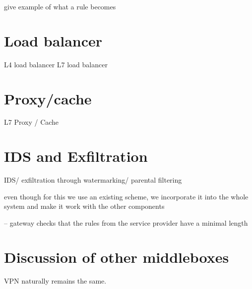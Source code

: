 give example of what a rule becomes

\section{Load balancer}\label{sec:loadb}

L4 load balancer
L7 load balancer

\section{Proxy/cache}\label{sec:proxy}

L7 Proxy / Cache

\section{IDS and Exfiltration}\label{sec:IDS}

IDS/ exfiltration through watermarking/ parental filtering

even though for this we use an existing scheme, we incorporate it into the whole
system and make it work with the other components

-- gateway checks that the rules from the service provider have a minimal length 


\section{Discussion of other middleboxes}\label{sec:vpn} \label{sec:other} \label{sec:not_supp}

VPN naturally remains the same. 